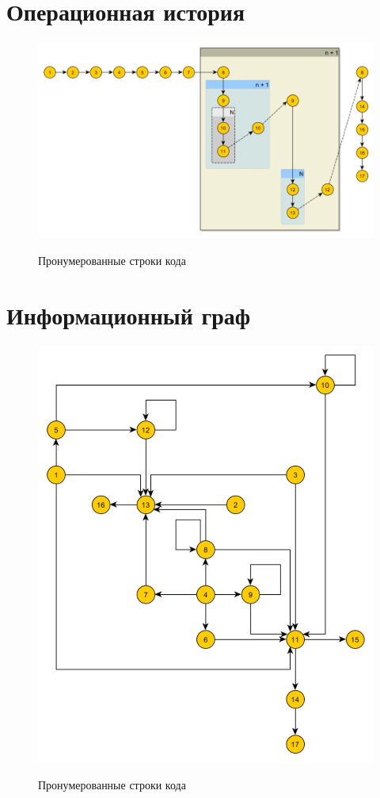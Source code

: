 \documentclass[12pt]{report}
\begin{document}
\section{Операционная история}
\begin{figure}[H]
	\centering	
	{\includegraphics[scale=1.1]{oi.png}}
	\caption{Пронумерованные строки кода}
\end{figure}

\section{Информационный граф}
	\begin{figure}[H]	
	\centering	
	{\includegraphics[scale = 1]{ig.png}}
	\caption{Пронумерованные строки кода}
\end{figure}
\end{document}
